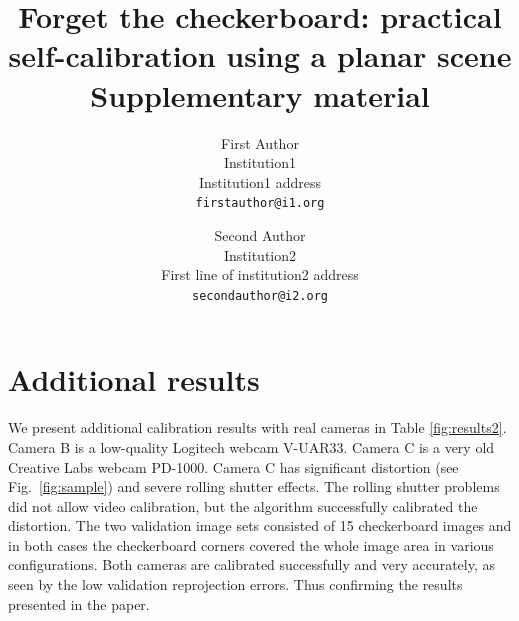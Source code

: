 \documentclass[10pt,twocolumn,letterpaper]{article}
\begin{document}
\title{Forget the checkerboard: practical self-calibration using a planar scene\\Supplementary material}

\author{First Author\\
Institution1\\
Institution1 address\\
{\tt\small firstauthor@i1.org}
\and
Second Author\\
Institution2\\
First line of institution2 address\\
{\tt\small secondauthor@i2.org}
}

\maketitle


\section{Additional results}
We present additional calibration results with real cameras in Table \ref{fig:results2}. Camera B is a low-quality Logitech webcam V-UAR33. Camera C is a very old Creative Labs webcam PD-1000. Camera C has significant distortion (see Fig.~\ref{fig:sample}) and severe rolling shutter effects. The rolling shutter problems did not allow video calibration, but the algorithm successfully calibrated the distortion. The two validation image sets consisted of 15 checkerboard images and in both cases the checkerboard corners covered the whole image area in various configurations. Both cameras are calibrated successfully and very accurately, as seen by the low validation reprojection errors. Thus confirming the results presented in the paper. 
\end{document}
